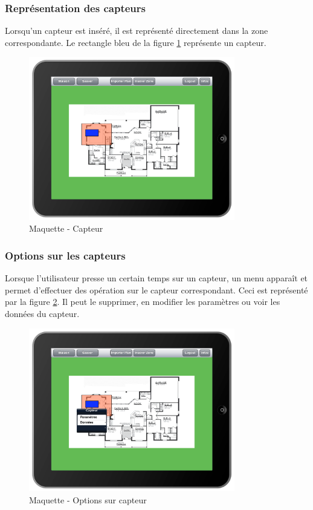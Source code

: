 \subsubsection{Représentation des capteurs}
Lorsqu'un capteur est inséré, il est représenté directement dans la zone correspondante. Le rectangle bleu de la figure \ref{gra:maq10} représente un capteur.
\begin{figure}[H]
      \centering
      \includegraphics[width=9cm]{00_media/04_Maquette_10.pdf}
      \caption{Maquette - Capteur}
      \label{gra:maq10}
\end{figure}
\subsubsection{Options sur les capteurs}
Lorsque l'utilisateur presse un certain temps sur un capteur, un menu apparaît et permet d'effectuer des opération sur le capteur correspondant. Ceci est représenté par la figure \ref{gra:maq11}. Il peut le supprimer, en modifier les paramètres ou voir les données du capteur.
\begin{figure}[H]
      \centering
      \includegraphics[width=9cm]{00_media/04_Maquette_11.pdf}
      \caption{Maquette - Options sur capteur}
      \label{gra:maq11}
\end{figure}
